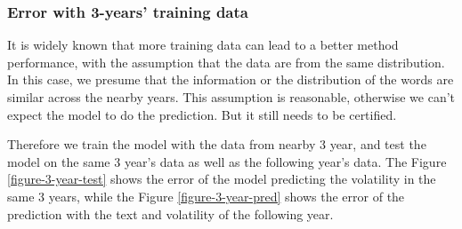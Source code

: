 \documentclass[11pt]{article}
\begin{document}
\subsubsection{Error with 3-years' training data}

It is widely known that more training data can lead to a better method performance, with the assumption that the data are from the same distribution. In this case, we presume that the information or the distribution of the words are similar across the nearby years. This assumption is reasonable, otherwise we can't expect the model to do the prediction. But it still needs to be certified.

Therefore we train the model with the data from nearby 3 year, and test the model on the same 3 year's data as well as the following year's data. The Figure \ref{figure-3-year-test} shows the error of the model predicting the volatility in the same 3 years, while the Figure \ref{figure-3-year-pred} shows the error of the prediction with the text and volatility of the following year.
\end{document}
